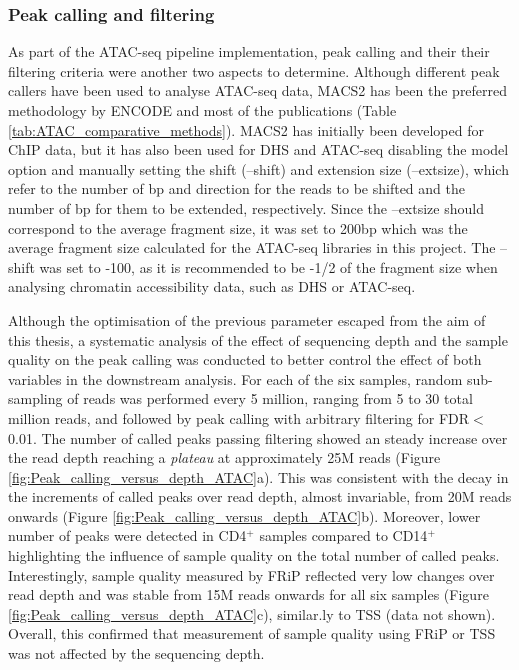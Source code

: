 \subsubsection{Peak calling and filtering}
As part of the ATAC-seq pipeline implementation, peak calling and their their filtering criteria were another two aspects to determine.
Although different peak callers have been used to analyse ATAC-seq data, MACS2 has been the preferred methodology by ENCODE and most of the publications (Table \ref{tab:ATAC_comparative_methods}). MACS2 has initially been developed for ChIP data, but it has also been used for DHS and ATAC-seq disabling the model option and manually setting the shift (--shift) and extension size (--extsize), which refer to the number of bp and direction for the reads to be shifted and the number of bp for them to be extended, respectively. Since the --extsize should correspond to the average fragment size, it was set to 200bp which was the average fragment size calculated for the ATAC-seq libraries in this project. The --shift was set to -100, as it is recommended to be -1/2 of the fragment size when analysing chromatin accessibility data, such as DHS or ATAC-seq. 

Although the optimisation of the previous parameter escaped from the aim of this thesis, a systematic analysis of the effect of sequencing depth and the sample quality on the peak calling was conducted to better control the effect of both variables in the downstream analysis. For each of the six samples, random sub-sampling of reads was performed every 5 million, ranging from 5 to 30 total million reads, and followed by peak calling with arbitrary filtering for FDR$<$0.01. The number of called peaks passing filtering showed an steady increase over the read depth reaching a \textit{plateau} at approximately 25M reads (Figure \ref{fig:Peak_calling_versus_depth_ATAC}a). This was consistent with the decay in the increments of called peaks over read depth, almost invariable, from 20M reads onwards (Figure \ref{fig:Peak_calling_versus_depth_ATAC}b). Moreover, lower number of peaks were detected in CD4$^+$ samples compared to CD14$^+$ highlighting the influence of sample quality on the total number of called peaks. Interestingly, sample quality measured by FRiP reflected very low changes over read depth and was stable from 15M reads onwards for all six samples (Figure \ref{fig:Peak_calling_versus_depth_ATAC}c), similar.ly to TSS (data not shown). Overall, this confirmed that measurement of sample quality using FRiP or TSS was not affected by the sequencing depth.


